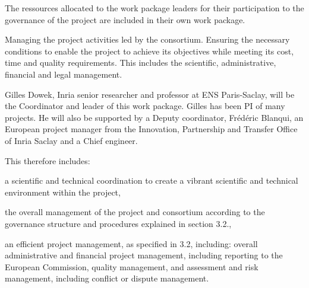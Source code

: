\begin{workpackage}[id=management,type=MGT,wphases=1-48,
  short=Management,
  title=Management,
  InrRM=44,
  lead=Inr]
  
  The ressources allocated to the work package leaders for their
  participation to the governance of the project are included in their
  own work package.

  \begin{wpobjectives}
    Managing the
    project activities led by the consortium. Ensuring the necessary
    conditions to enable
    the project to achieve its objectives while meeting its cost, time
    and quality requirements. This includes the scientific,
    administrative, financial and legal management.

    Gilles Dowek, Inria senior researcher and professor at ENS
    Paris-Saclay, will be the Coordinator and leader of this work
    package. Gilles has been PI of many projects. He will also be
    supported by a Deputy coordinator, Frédéric Blanqui, an European
    project manager from the Innovation, Partnership and Transfer
    Office of Inria Saclay and a Chief engineer.

This therefore includes:
\begin{compactitem}
\item a scientific and technical coordination to create a vibrant scientific and technical environment within the project,
\item the overall management of the project and consortium according to the governance structure and procedures explained in section 3.2.,
\item an efficient project management, as specified in 3.2, including:
 overall administrative and financial project management, including reporting to the European Commission,
quality management,
and assessment and risk management, including conflict or dispute management.
\end{compactitem}
\end{wpobjectives}


\end{workpackage}
